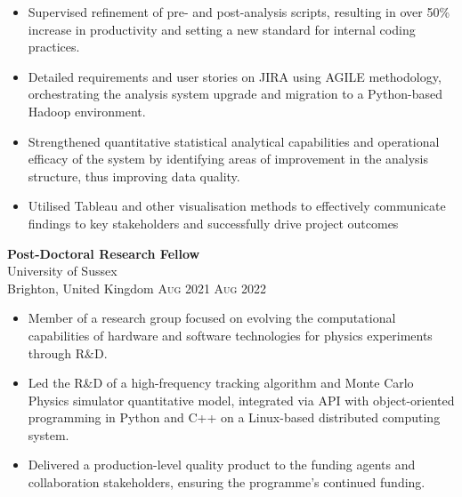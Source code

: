 \documentclass[oneside]{article}
\newcommand{\empitem}[7]{
        {\large \textbf{#1}} \\
        {{\fontseries{medium}\selectfont #2}}\\
        {{\fontseries{light}\selectfont #3}} \hfill
        {\scshape\fontseries{light}\selectfont\footnotesize #4 \textendash{} #5 #6} 
        #7
}
\begin{document}
{\begin{minipage}[t][\dimexpr\textheight-2\fboxrule-2\fboxsep\relax][t]{\dimexpr0.6\textwidth-2\fboxrule-2\fboxsep\relax}
{\begin{itemize}
            \item Supervised refinement of pre- and post-analysis scripts, resulting in over 50\% increase in productivity and setting a new standard for internal coding practices.
            \item Detailed requirements and user stories on JIRA using AGILE methodology, orchestrating the analysis system upgrade and migration to a Python-based Hadoop environment.
            \item Strengthened quantitative statistical analytical capabilities and operational efficacy of the system by identifying areas of improvement in the analysis structure, thus improving data quality.
            \item Utilised Tableau and other visualisation methods to effectively communicate findings to key stakeholders and successfully drive project outcomes
        \end{itemize}
        }
%
        \empitem{Post-Doctoral Research Fellow}
        {University of Sussex}
        {Brighton, United Kingdom}
        {Aug 2021}
        {Aug 2022}
        {}
        {
        \begin{itemize}
            \setlength{\itemsep}{-3pt}
            \item Member of a research group focused on evolving the computational capabilities of hardware and software technologies for physics experiments through R$\&$D.

            \item Led the R\&D of a high-frequency tracking algorithm and Monte Carlo Physics simulator quantitative model, integrated via API with object-oriented programming in Python and C++ on a Linux-based distributed computing system. 

            \item Delivered a production-level quality product to the funding agents and collaboration stakeholders, ensuring the programme’s continued funding. 
 

\end{itemize}}
\end{minipage}}
\end{document}
